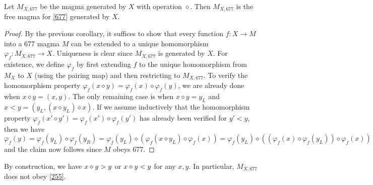 \begin{corollary} Let $M_{X,677}$ be the magma generated by $X$ with operation $\diamond$.  Then $M_{X,677}$ is the free magma for \eqref{677} generated by $X$.
\end{corollary}

\begin{proof}  By the previous corollary, it suffices to show that every function $f: X \to M$ into a 677 magma $M$ can be extended to a unique homomorphism $\varphi_f: M_{X,677} \to X$. Uniqueness is clear since $M_{X,677}$ is generated by $X$.  For existence, we define $\varphi_f$ by first extending $f$ to the unique homomorphism from $M_X$ to $X$ (using the pairing map) and then restricting to $M_{X,677}$.  To verify the homomorphism property $\varphi_f(x \diamond y) = \varphi_f(x) \diamond \varphi_f(y)$, we are already done when $x \diamond y = (x,y)$. The only remaining case is when $x \diamond y = y_L$ and $x < y = (y_L,  (x \diamond y_L) \diamond x)$.   If we assume inductively that the homomorphism property $\varphi_f(x' \diamond y') = \varphi_f(x') \diamond \varphi_f(y')$ has already been verified for $y' < y$, then we have
  $$ \varphi_f(y) = \varphi_f(y_L) \diamond \varphi_f(y_R) = \varphi_f(y_L) \diamond (\varphi_f(x \diamond y_L) \diamond \varphi_f(x)) =  \varphi_f(y_L) \diamond ((\varphi_f(x) \diamond \varphi_f(y_L)) \diamond \varphi_f(x))$$
  and the claim now follows since $M$ obeys 677.
\end{proof}

By construction, we have $x \diamond y > y$ or $x \diamond y < y$ for any $x,y$.  In particular, $M_{X,677}$ does not obey \eqref{255}.


